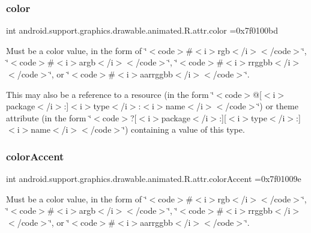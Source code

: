 \subsubsection{\texorpdfstring{color}{color}}
{\footnotesize\ttfamily int android.\+support.\+graphics.\+drawable.\+animated.\+R.\+attr.\+color =0x7f0100bd\hspace{0.3cm}{\ttfamily [static]}}

Must be a color value, in the form of \char`\"{}$<$code$>$\#$<$i$>$rgb$<$/i$>$$<$/code$>$\char`\"{}, \char`\"{}$<$code$>$\#$<$i$>$argb$<$/i$>$$<$/code$>$\char`\"{}, \char`\"{}$<$code$>$\#$<$i$>$rrggbb$<$/i$>$$<$/code$>$\char`\"{}, or \char`\"{}$<$code$>$\#$<$i$>$aarrggbb$<$/i$>$$<$/code$>$\char`\"{}. 

This may also be a reference to a resource (in the form \char`\"{}$<$code$>$@\mbox{[}$<$i$>$package$<$/i$>$\+:\mbox{]}$<$i$>$type$<$/i$>$\+:$<$i$>$name$<$/i$>$$<$/code$>$\char`\"{}) or theme attribute (in the form \char`\"{}$<$code$>$?\mbox{[}$<$i$>$package$<$/i$>$\+:\mbox{]}\mbox{[}$<$i$>$type$<$/i$>$\+:\mbox{]}$<$i$>$name$<$/i$>$$<$/code$>$\char`\"{}) containing a value of this type. \mbox{\label{classandroid_1_1support_1_1graphics_1_1drawable_1_1animated_1_1R_1_1attr_a3323c52db513658650279a6644221f04}} 
\subsubsection{\texorpdfstring{color\+Accent}{colorAccent}}
{\footnotesize\ttfamily int android.\+support.\+graphics.\+drawable.\+animated.\+R.\+attr.\+color\+Accent =0x7f01009e\hspace{0.3cm}{\ttfamily [static]}}

Must be a color value, in the form of \char`\"{}$<$code$>$\#$<$i$>$rgb$<$/i$>$$<$/code$>$\char`\"{}, \char`\"{}$<$code$>$\#$<$i$>$argb$<$/i$>$$<$/code$>$\char`\"{}, \char`\"{}$<$code$>$\#$<$i$>$rrggbb$<$/i$>$$<$/code$>$\char`\"{}, or \char`\"{}$<$code$>$\#$<$i$>$aarrggbb$<$/i$>$$<$/code$>$\char`\"{}. 

